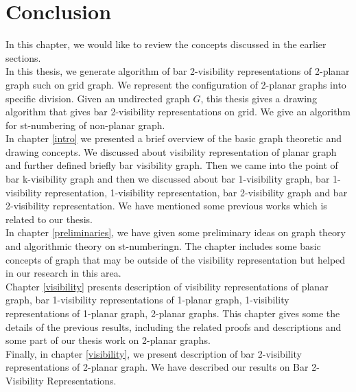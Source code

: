 \chapter{Conclusion}\label{con}

In this chapter, we would like to review the concepts discussed in the earlier sections.
\\
In this thesis, we generate algorithm of bar 2-visibility representations of 2-planar graph such on grid graph. We represent the configuration of 2-planar graphs into specific division. Given an undirected graph $G$, this thesis gives a drawing algorithm that gives bar 2-visibility representations on grid. We give an algorithm for st-numbering of non-planar graph.
\\
In chapter \ref{intro}  we presented a brief overview of the basic graph theoretic and drawing concepts. We discussed about visibility representation of planar graph and further defined briefly bar visibility graph. Then we came into the point of bar k-visibility graph and then we discussed about bar 1-visibility graph,   bar 1-visibility representation, 1-visibility representation, bar 2-visibility graph and bar 2-visibility representation. We have mentioned some previous works which is related to our thesis.
\\
In chapter \ref{preliminaries}, we have given some preliminary ideas on graph theory and algorithmic theory on st-numberingn. The chapter includes some basic concepts of graph that may be outside of the visibility representation but helped in our research in this area.
\\
Chapter \ref{visibility} presents description of visibility representations of planar graph, bar 1-visibility representations of 1-planar graph, 1-visibility representations of 1-planar graph, 2-planar graphs. This chapter gives some the details of the previous results, including the related proofs and descriptions and some part of our thesis work on 2-planar graphs.
\\
Finally, in chapter \ref{visibility}, we present description of bar 2-visibility representations of 2-planar graph. We have described our results on Bar 2-Visibility Representations.
\endinput
